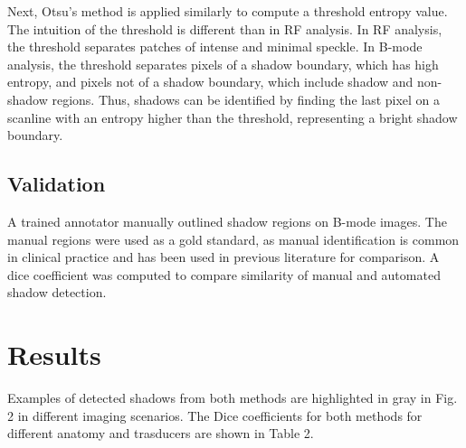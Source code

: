 \documentclass[preprint,5p,authoryear]{elsarticle}
\begin{document}
Next, Otsu's method is applied similarly to compute a threshold entropy value. The intuition of the threshold is different than in RF analysis. In RF analysis, the threshold separates patches of intense and minimal speckle. In B-mode analysis, the threshold separates pixels of a shadow boundary, which has high entropy, and pixels not of a shadow boundary, which include shadow and non-shadow regions. Thus, shadows can be identified by finding the last pixel on a scanline with an entropy higher than the threshold, representing a bright shadow boundary.



\subsection*{Validation}

A trained annotator manually outlined shadow regions on B-mode images. The manual regions were used as a gold standard, as manual identification is common in clinical practice and has been used in previous literature for comparison. A dice coefficient was computed to compare similarity of manual and automated shadow detection.

\section*{Results}
\label{Results}
Examples of detected shadows from both methods are highlighted in gray in Fig. 2 in different imaging scenarios. The Dice coefficients for both methods for different anatomy and trasducers are shown in Table 2. 
\end{document}
